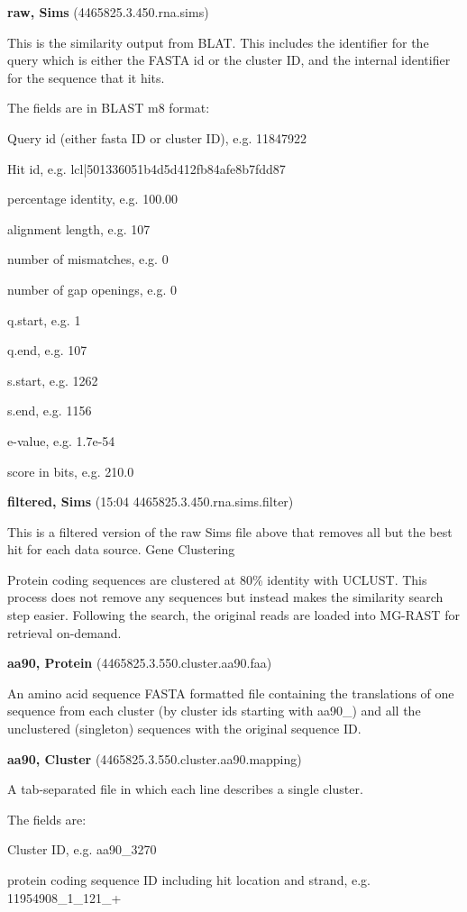 \documentclass[12pt,fullpage]{report}
\begin{document}
{\begin{mdframed}
\textbf{raw, Sims} (4465825.3.450.rna.sims)
\par
This is the similarity output from BLAT. This includes the identifier for the query which is either the FASTA id or the cluster ID, and the internal identifier for the sequence that it hits.
\par
The fields are in BLAST m8 format:
\par
Query id (either fasta ID or cluster ID), e.g. 11847922
\par
Hit id, e.g. lcl|501336051b4d5d412fb84afe8b7fdd87
\par
percentage identity, e.g. 100.00
\par
alignment length, e.g. 107
\par
number of mismatches, e.g. 0
\par
number of gap openings, e.g. 0
\par
q.start, e.g. 1
\par
q.end, e.g. 107
\par
s.start, e.g. 1262
\par
s.end, e.g. 1156
\par
e-value, e.g. 1.7e-54
\par
score in bits, e.g. 210.0
\par
\textbf{filtered, Sims} (15:04 4465825.3.450.rna.sims.filter)
\par
This is a filtered version of the raw Sims file above that removes all but the best hit for each data source.
Gene Clustering
\par
Protein coding sequences are clustered at 80\% identity with UCLUST. This process does not remove any sequences but instead makes the similarity search step easier. Following the search, the original reads are loaded into MG-RAST for retrieval on-demand.
\par
\textbf{aa90, Protein} (4465825.3.550.cluster.aa90.faa)
\par
An amino acid sequence FASTA formatted file containing the translations of one sequence from each cluster (by cluster ids starting with aa90\_) and all the unclustered (singleton) sequences with the original sequence ID.
\par
\textbf{aa90, Cluster} (4465825.3.550.cluster.aa90.mapping)
\par
A tab-separated file in which each line describes a single cluster.
\par
The fields are:
\par
Cluster ID, e.g. aa90\_3270
\par
protein coding sequence ID including hit location and strand, e.g. 11954908\_1\_121\_+

\end{mdframed}}
\end{document}
